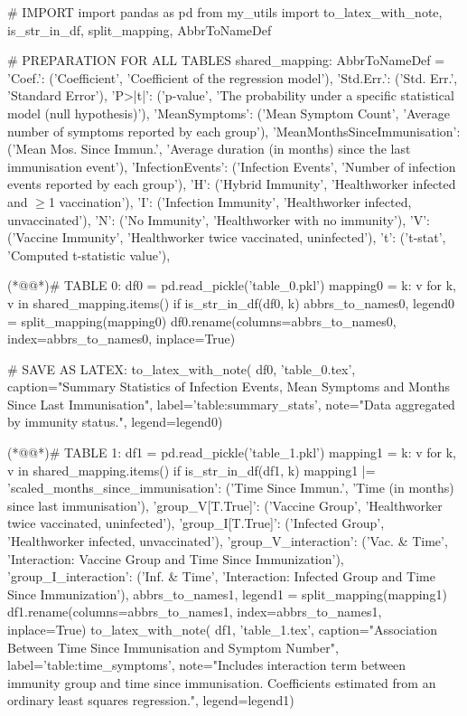 \documentclass[11pt]{article}
\begin{document}
\begin{python}

# IMPORT
import pandas as pd
from my_utils import to_latex_with_note, is_str_in_df, split_mapping, AbbrToNameDef

# PREPARATION FOR ALL TABLES
shared_mapping: AbbrToNameDef = {
    'Coef.': ('Coefficient', 'Coefficient of the regression model'),
    'Std.Err.': ('Std. Err.', 'Standard Error'),
    'P>|t|': ('p-value', 'The probability under a specific statistical model (null hypothesis)'),
    'MeanSymptoms': ('Mean Symptom Count', 'Average number of symptoms reported by each group'),
    'MeanMonthsSinceImmunisation': ('Mean Mos. Since Immun.', 'Average duration (in months) since the last immunisation event'),
    'InfectionEvents': ('Infection Events', 'Number of infection events reported by each group'),
    'H': ('Hybrid Immunity', 'Healthworker infected and $\geq$1 vaccination'),
    'I': ('Infection Immunity', 'Healthworker infected, unvaccinated'),
    'N': ('No Immunity', 'Healthworker with no immunity'),
    'V': ('Vaccine Immunity', 'Healthworker twice vaccinated, uninfected'),
    't': ('t-stat', 'Computed t-statistic value'),
}

(*@@*)# TABLE 0:
df0 = pd.read_pickle('table_0.pkl')
mapping0 = {
    k: v for k, v in shared_mapping.items() if is_str_in_df(df0, k)
}
abbrs_to_names0, legend0 = split_mapping(mapping0)
df0.rename(columns=abbrs_to_names0, index=abbrs_to_names0, inplace=True)

# SAVE AS LATEX:
to_latex_with_note(
    df0, 'table_0.tex',
    caption="Summary Statistics of Infection Events, Mean Symptoms and Months Since Last Immunisation",
    label='table:summary_stats',
    note="Data aggregated by immunity status.",
    legend=legend0)

(*@@*)# TABLE 1:
df1 = pd.read_pickle('table_1.pkl')
mapping1 = {
    k: v for k, v in shared_mapping.items() if is_str_in_df(df1, k)
}
mapping1 |= {
    'scaled_months_since_immunisation': ('Time Since Immun.', 'Time (in months) since last immunisation'),
    'group_V[T.True]': ('Vaccine Group', 'Healthworker twice vaccinated, uninfected'),
    'group_I[T.True]': ('Infected Group', 'Healthworker infected, unvaccinated'),
    'group_V_interaction': ('Vac. & Time', 'Interaction: Vaccine Group and Time Since Immunization'),
    'group_I_interaction': ('Inf. & Time', 'Interaction: Infected Group and Time Since Immunization'),
}
abbrs_to_names1, legend1 = split_mapping(mapping1)
df1.rename(columns=abbrs_to_names1, index=abbrs_to_names1, inplace=True)
to_latex_with_note(
    df1, 'table_1.tex',
    caption="Association Between Time Since Immunisation and Symptom Number",
    label='table:time_symptoms',
    note="Includes interaction term between immunity group and time since immunisation. Coefficients estimated from an ordinary least squares regression.",
    legend=legend1)


\end{python}
\end{document}
